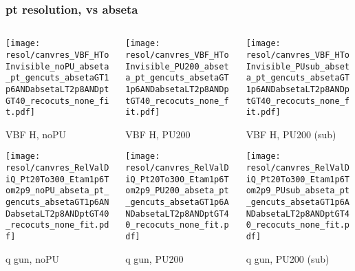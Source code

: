 \documentclass[8pt]{beamer}
\begin{document}
  \begin{frame}
  \frametitle{pt resolution, vs abseta}
  
  \begin{columns}
   \begin{column}{0.35\textwidth}
     \texttt{[image: resol/canvres\_VBF\_HToInvisible\_noPU\_abseta\_pt\_gencuts\_absetaGT1p6ANDabsetaLT2p8ANDptGT40\_recocuts\_none\_fit.pdf]}
     
     VBF H, noPU
    
     \texttt{[image: resol/canvres\_RelValDiQ\_Pt20To300\_Etam1p6Tom2p9\_noPU\_abseta\_pt\_gencuts\_absetaGT1p6ANDabsetaLT2p8ANDptGT40\_recocuts\_none\_fit.pdf]}
     
     q gun, noPU
   \end{column}
   \begin{column}{0.35\textwidth}
     \texttt{[image: resol/canvres\_VBF\_HToInvisible\_PU200\_abseta\_pt\_gencuts\_absetaGT1p6ANDabsetaLT2p8ANDptGT40\_recocuts\_none\_fit.pdf]}
     
     VBF H, PU200
    
     \texttt{[image: resol/canvres\_RelValDiQ\_Pt20To300\_Etam1p6Tom2p9\_PU200\_abseta\_pt\_gencuts\_absetaGT1p6ANDabsetaLT2p8ANDptGT40\_recocuts\_none\_fit.pdf]}
     
     q gun, PU200
   \end{column}
   \begin{column}{0.35\textwidth}
     \texttt{[image: resol/canvres\_VBF\_HToInvisible\_PUsub\_abseta\_pt\_gencuts\_absetaGT1p6ANDabsetaLT2p8ANDptGT40\_recocuts\_none\_fit.pdf]}
     
     VBF H, PU200 (sub)
    
     \texttt{[image: resol/canvres\_RelValDiQ\_Pt20To300\_Etam1p6Tom2p9\_PUsub\_abseta\_pt\_gencuts\_absetaGT1p6ANDabsetaLT2p8ANDptGT40\_recocuts\_none\_fit.pdf]}
     
     q gun, PU200 (sub)
   \end{column}
  \end{columns}
 \end{frame}
 
\end{document}
